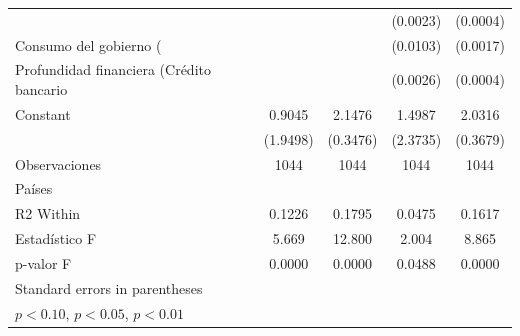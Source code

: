 \begin{table}[htbp]
\begin{tabular}{l*{4}{c}}
                    &                     &                     &    (0.0023)         &    (0.0004)         \\
\addlinespace
Consumo del gobierno (%
                    &                     &                     &    (0.0103)         &    (0.0017)         \\
\addlinespace
Profundidad financiera (Crédito bancario %
                    &                     &                     &    (0.0026)         &    (0.0004)         \\
\addlinespace
Constant            &      0.9045         &      2.1476\sym{***}&      1.4987         &      2.0316\sym{***}\\
                    &    (1.9498)         &    (0.3476)         &    (2.3735)         &    (0.3679)         \\
\midrule
Observaciones       &        1044         &        1044         &        1044         &        1044         \\
Países              &                     &                     &                     &                     \\
R2 Within           &      0.1226         &      0.1795         &      0.0475         &      0.1617         \\
Estadístico F       &       5.669         &      12.800         &       2.004         &       8.865         \\
p-valor F           &      0.0000         &      0.0000         &      0.0488         &      0.0000         \\
\bottomrule
\multicolumn{5}{l}{\footnotesize Standard errors in parentheses}\\
\multicolumn{5}{l}{\footnotesize \sym{*} \(p<0.10\), \sym{**} \(p<0.05\), \sym{***} \(p<0.01\)}\\
\end{tabular}
\end{table}
